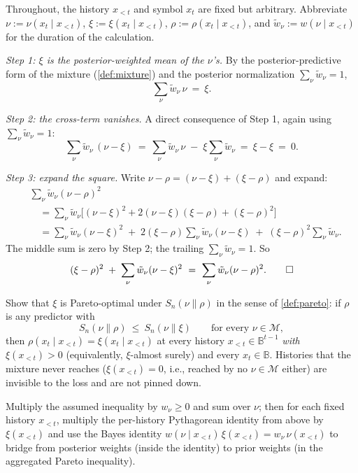 \documentclass[fontsize=11pt, parskip=half]{scrartcl}
\newcommand{\Mc}{\mathcal{M}}
\newcommand{\Sn}[2]{S_{n}(#1 \parallel #2)}
\begin{document}
\begin{solution}
Throughout, the history $x_{<t}$ and symbol $x_t$ are fixed but arbitrary.
Abbreviate $\nu := \nu(x_t \mid x_{<t})$, $\xi := \xi(x_t \mid x_{<t})$,
$\rho := \rho(x_t \mid x_{<t})$, and $\tilde w_\nu := w(\nu \mid x_{<t})$ for
the duration of the calculation.

\medskip
\textit{Step 1: $\xi$ is the posterior-weighted mean of the $\nu$'s.}
By the posterior-predictive form of the mixture (\cref{def:mixture}) and the
posterior normalization $\sum_\nu \tilde w_\nu = 1$,
\[
  \sum_\nu \tilde w_\nu \, \nu ~=~ \xi.
\]

\medskip
\textit{Step 2: the cross-term vanishes.}
A direct consequence of Step 1, again using $\sum_\nu \tilde w_\nu = 1$:
\[
  \sum_\nu \tilde w_\nu \, (\nu - \xi)
  ~=~ \sum_\nu \tilde w_\nu \, \nu \;-\; \xi \sum_\nu \tilde w_\nu
  ~=~ \xi - \xi ~=~ 0.
\]

\medskip
\textit{Step 3: expand the square.}
Write $\nu - \rho = (\nu - \xi) + (\xi - \rho)$ and expand:
\begin{align*}
&\sum_\nu \tilde w_\nu (\nu - \rho)^2 \\
&\quad= \sum_\nu \tilde w_\nu\bigl[(\nu - \xi)^2 + 2(\nu - \xi)(\xi - \rho) + (\xi - \rho)^2\bigr] \\
&\quad= \sum_\nu \tilde w_\nu (\nu - \xi)^2
   \;+\; 2(\xi - \rho)\sum_\nu \tilde w_\nu (\nu - \xi)
   \;+\; (\xi - \rho)^2 \sum_\nu \tilde w_\nu.
\end{align*}
The middle sum is zero by Step 2; the trailing $\sum_\nu \tilde w_\nu = 1$. So
\[
  (\xi - \rho)^2 \;+\; \sum_\nu \tilde w_\nu (\nu - \xi)^2
  ~=~ \sum_\nu \tilde w_\nu (\nu - \rho)^2. \qedhere
\]
\end{solution}

\begin{exercise}
\label{prob:sq_pareto}



Show that $\xi$ is Pareto-optimal under $\Sn{\nu}{\rho}$ in the sense of \cref{def:pareto}: if $\rho$ is any predictor with
\[
  \Sn{\nu}{\rho} ~\leq~ \Sn{\nu}{\xi} \qquad \text{for every } \nu \in \Mc,
\]
then $\rho(x_t \mid x_{<t}) = \xi(x_t \mid x_{<t})$ at every history $x_{<t} \in
\mathbb{B}^{t-1}$ \emph{with $\xi(x_{<t}) > 0$} (equivalently, $\xi$-almost
surely) and every $x_t \in \mathbb{B}$. Histories that the mixture never reaches
($\xi(x_{<t}) = 0$, i.e., reached by no $\nu \in \Mc$ either) are invisible
to the loss and are not pinned down.

\begin{hint}
Multiply the assumed inequality by $w_\nu \geq 0$ and sum over
$\nu$; then for each fixed history $x_{<t}$, multiply the per-history
Pythagorean identity from above by $\xi(x_{<t})$ and use the Bayes identity
$w(\nu \mid x_{<t})\,\xi(x_{<t}) = w_\nu \,\nu(x_{<t})$ to bridge from posterior
weights (inside the identity) to prior weights (in the aggregated Pareto
inequality).
\end{hint}
\end{exercise}
\end{document}
